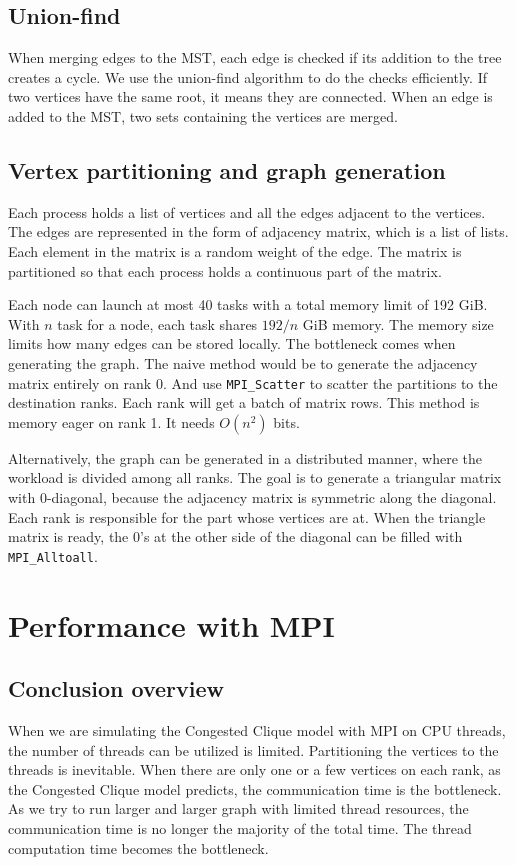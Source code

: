\documentclass[english, 12pt, a4paper, elec, utf8, a-2b, online]{aaltothesis}
\begin{document}

\subsection{Union-find}
When merging edges to the MST, each edge is checked if its addition to the tree creates a cycle. We use the union-find algorithm to do the checks efficiently. If two vertices have the same root, it means they are connected. When an edge is added to the MST, two sets containing the vertices are merged. 

\subsection{Vertex partitioning and graph generation}
Each process holds a list of vertices and all the edges adjacent to the vertices. The edges are represented in the form of adjacency matrix, which is a list of lists. Each element in the matrix is a random weight of the edge. The matrix is partitioned so that each process holds a continuous part of the matrix. 

Each node can launch at most 40 tasks with a total memory limit of 192 GiB. With $n$ task for a node, each task shares $192/n$ GiB memory. The memory size limits how many edges can be stored locally. The bottleneck comes when generating the graph. 
The naive method would be to generate the adjacency matrix entirely on rank 0. And use \texttt{MPI\_Scatter} to scatter the partitions to the destination ranks. Each rank will get a batch of matrix rows. This method is memory eager on rank 1. It needs $O(n^2)$ bits. 

Alternatively, the graph can be generated in a distributed manner, where the workload is divided among all ranks. The goal is to generate a triangular matrix with 0-diagonal, because the adjacency matrix is symmetric along the diagonal. Each rank is responsible for the part whose vertices are at. When the triangle matrix is ready, the 0's at the other side of the diagonal can be filled with \texttt{MPI\_Alltoall}.
\clearpage

\section{Performance with MPI}
\label{sec:mpi_performance}
\subsection{Conclusion overview}
When we are simulating the Congested Clique model with MPI on CPU threads, the number of threads can be utilized is limited. Partitioning the vertices to the threads is inevitable. When there are only one or a few vertices on each rank, as the Congested Clique model predicts, the communication time is the bottleneck. As we try to run larger and larger graph with limited thread resources, the communication time is no longer the majority of the total time. The thread computation time becomes the bottleneck. %
\end{document}
